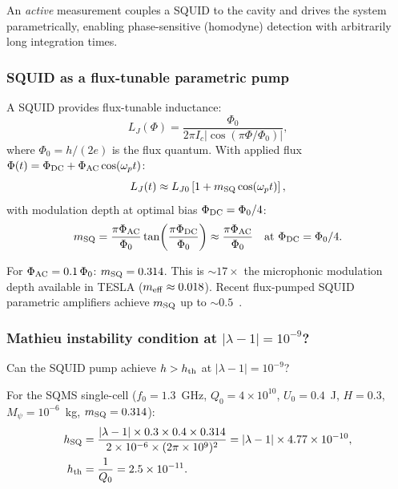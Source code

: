 \documentclass[11pt,twocolumn]{article}
\newcommand{\lam}{\lambda}
\newcommand{\Mpsi}{M_\psi}
\begin{document}
An \emph{active} measurement couples a SQUID to the cavity and
drives the system parametrically, enabling phase-sensitive (homodyne)
detection with arbitrarily long integration times.

\subsubsection{SQUID as a flux-tunable parametric pump}

A SQUID provides flux-tunable inductance:
\begin{equation}
L_J(\Phi) = \frac{\Phi_0}{2\pi I_c|\cos(\pi\Phi/\Phi_0)|},
\label{eq:SQUID_L}
\end{equation}
where $\Phi_0 = h/(2e)$ is the flux quantum. With applied flux
$\Phi(t) = \Phi_{\rm DC} + \Phi_{\rm AC}\cos(\omega_p t)$:
\begin{equation}
L_J(t) \approx L_{J0}\left[1 + m_{\rm SQ}\cos(\omega_p t)\right],
\label{eq:SQUID_mod}
\end{equation}
with modulation depth at optimal bias $\Phi_{\rm DC} = \Phi_0/4$:
\begin{equation}
m_{\rm SQ} = \frac{\pi\Phi_{\rm AC}}{\Phi_0}
\tan\!\left(\frac{\pi\Phi_{\rm DC}}{\Phi_0}\right)
\approx \frac{\pi\Phi_{\rm AC}}{\Phi_0}
\quad\text{at } \Phi_{\rm DC} = \Phi_0/4.
\label{eq:m_SQUID}
\end{equation}

For $\Phi_{\rm AC} = 0.1\,\Phi_0$: $m_{\rm SQ} = 0.314$. This is
$\sim 17\times$ the microphonic modulation depth available in TESLA
($m_{\rm eff} \approx 0.018$). Recent flux-pumped SQUID parametric
amplifiers achieve $m_{\rm SQ}$ up to $\sim 0.5$~\cite{KFP2025}.

\subsubsection{Mathieu instability condition at $|\lam-1| = 10^{-9}$?}

Can the SQUID pump achieve $h > h_{\rm th}$ at $|\lam-1| = 10^{-9}$?

For the SQMS single-cell ($f_0 = 1.3$~GHz, $Q_0 = 4\times10^{10}$,
$U_0 = 0.4$~J, $H = 0.3$, $\Mpsi = 10^{-6}$~kg, $m_{\rm SQ} = 0.314$):
\begin{align}
h_{\rm SQ} &= \frac{|\lam-1|\times0.3\times0.4\times0.314}
{2\times10^{-6}\times(2\pi\times10^9)^2}
= |\lam-1| \times 4.77\times10^{-10},
\\
h_{\rm th} &= \frac{1}{Q_0} = 2.5\times10^{-11}.
\end{align}
\end{document}
